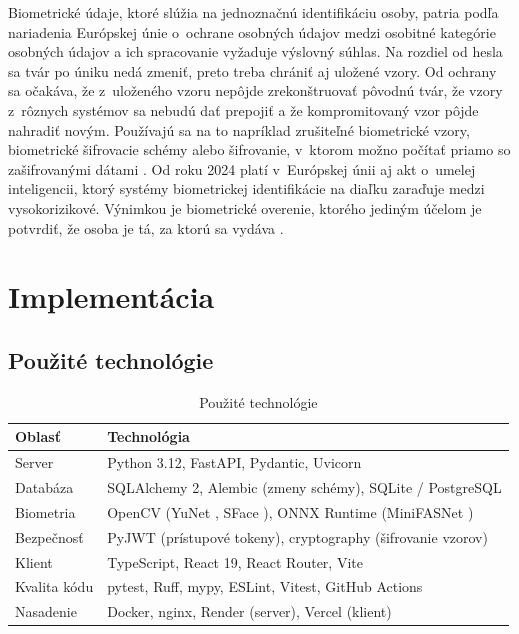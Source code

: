 \documentclass[12pt,a4paper,oneside]{report}
\begin{document}
Biometrické údaje, ktoré slúžia na jednoznačnú identifikáciu osoby, patria podľa
nariadenia Európskej únie o~ochrane osobných údajov medzi osobitné kategórie osobných
údajov a ich spracovanie vyžaduje výslovný súhlas. Na rozdiel od hesla sa tvár po úniku
nedá zmeniť, preto treba chrániť aj uložené vzory. Od ochrany sa očakáva, že z~uloženého
vzoru nepôjde zrekonštruovať pôvodnú tvár, že vzory z~rôznych systémov sa nebudú dať
prepojiť a že kompromitovaný vzor pôjde nahradiť novým. Používajú sa na to napríklad
zrušiteľné biometrické vzory, biometrické šifrovacie schémy alebo šifrovanie, v~ktorom
možno počítať priamo so zašifrovanými dátami \cite{abdullahi2024template}. Od roku 2024
platí v~Európskej únii aj akt o~umelej inteligencii, ktorý systémy biometrickej
identifikácie na diaľku zaraďuje medzi vysokorizikové. Výnimkou je biometrické overenie,
ktorého jediným účelom je potvrdiť, že osoba je tá, za ktorú sa vydáva \cite{euaiact2024}.


\chapter{Implementácia}
\label{ch:implementacia}

\section{Použité technológie}

\begin{table}[H]
  \centering
  \caption{Použité technológie}
  \label{tab:technologie}
  \begin{tabularx}{\textwidth}{@{}l X@{}}
    \toprule
    Oblasť & Technológia \\
    \midrule
    Server & Python 3.12, FastAPI, Pydantic, Uvicorn \\
    Databáza & SQLAlchemy 2, Alembic (zmeny schémy), SQLite / PostgreSQL \\
    Biometria & OpenCV (YuNet \cite{wu2023yunet}, SFace \cite{zhong2021sface}), ONNX Runtime (MiniFASNet \cite{minivision2020silentface}) \\
    Bezpečnosť & PyJWT (prístupové tokeny), cryptography (šifrovanie vzorov) \\
    Klient & TypeScript, React 19, React Router, Vite \\
    Kvalita kódu & pytest, Ruff, mypy, ESLint, Vitest, GitHub Actions \\
    Nasadenie & Docker, nginx, Render (server), Vercel (klient) \\
    \bottomrule
  \end{tabularx}
\end{table}
\end{document}
